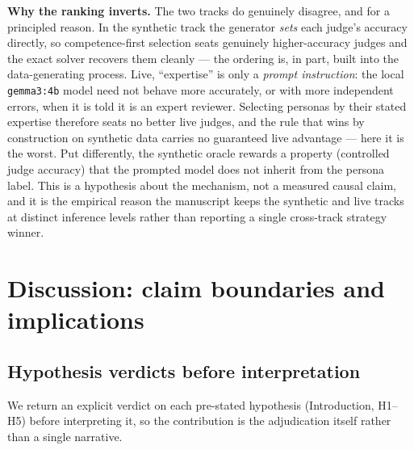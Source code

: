 \documentclass[
]{article}
\begin{document}
\textbf{Why the ranking inverts.} The two tracks do genuinely disagree,
and for a principled reason. In the synthetic track the generator
\emph{sets} each judge's accuracy directly, so competence-first
selection seats genuinely higher-accuracy judges and the exact solver
recovers them cleanly --- the ordering is, in part, built into the
data-generating process. Live, ``expertise'' is only a \emph{prompt
instruction}: the local \texttt{gemma3:4b} model need not behave more
accurately, or with more independent errors, when it is told it is an
expert reviewer. Selecting personas by their stated expertise therefore
seats no better live judges, and the rule that wins by construction on
synthetic data carries no guaranteed live advantage --- here it is the
worst. Put differently, the synthetic oracle rewards a property
(controlled judge accuracy) that the prompted model does not inherit
from the persona label. This is a hypothesis about the mechanism, not a
measured causal claim, and it is the empirical reason the manuscript
keeps the synthetic and live tracks at distinct inference levels rather
than reporting a single cross-track strategy winner.

\newpage

\section{Discussion: claim boundaries and
implications}\label{discussion-claim-boundaries-and-implications}

\subsection{Hypothesis verdicts before
interpretation}\label{hypothesis-verdicts-before-interpretation}

We return an explicit verdict on each pre-stated hypothesis
(Introduction, H1--H5) before interpreting it, so the contribution is
the adjudication itself rather than a single narrative.
\end{document}
